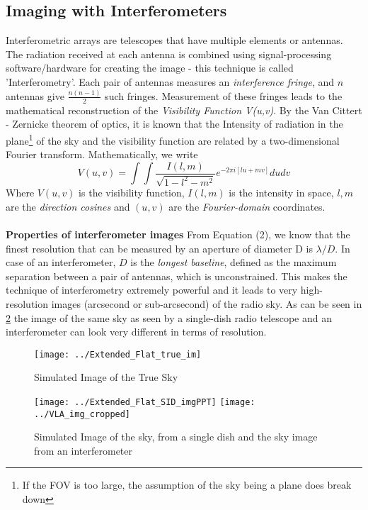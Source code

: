 \documentclass[twocolumn]{aastex61}
\begin{document}
\subsection{Imaging with Interferometers}
Interferometric arrays are telescopes that have multiple elements or antennas. The radiation received at each antenna is combined using signal-processing software/hardware for creating the image - this technique is called 'Interferometry'. Each pair of antennas measures an \textit{interference fringe}, and $n$ antennas give $\frac{n(n-1)}{2}$ such fringes. Measurement of these fringes leads to the mathematical reconstruction of the \textit{Visibility Function V(u,v)}. By the Van Cittert - Zernicke theorem of optics, it is known that the Intensity of radiation in the plane\footnote{If the FOV is too large, the assumption of the sky being a plane does break down} of the sky and the visibility function are related by a two-dimensional Fourier transform.
Mathematically, we write 
\begin{equation}
V(u,v) = \int\int\frac{I(l,m)}{\sqrt{1-l^2 - m^2}} e^{-2\pi i [lu+mv]} du dv
\end{equation} 
Where $V(u,v)$ is the visibility function, $I(l,m)$ is the intensity in space, $l, m$ are the \textit{direction cosines} and $(u,v)$ are the \textit{Fourier-domain} coordinates.\\\\
\textbf{Properties of interferometer images}
From Equation (2), we know that the finest resolution that can be measured by an aperture of diameter D is $\lambda/D$. In case of an interferometer, $D$ is the \textit{longest baseline}, defined as the maximum separation between a pair of antennas, which is unconstrained. 
This makes the technique of interferometry extremely powerful and it leads to very high-resolution images (arcsecond or sub-arcsecond) of the radio sky.
As can be seen in \hyperref[  2]{\figurename{ 2}}
the image of the same sky as seen by a single-dish radio telescope and an interferometer can look very different in terms of resolution.
\begin{figure}
\centering
\texttt{[image: ../Extended\_Flat\_true\_im]}
\caption{Simulated Image of the True Sky}
\label{ 1}
\end{figure}%
\begin{figure}
\centering
\texttt{[image: ../Extended\_Flat\_SID\_imgPPT]}
\texttt{[image: ../VLA\_img\_cropped]}
\caption{Simulated Image of the sky, from a single dish 
		and the sky image from an interferometer}
\label{ 2}
\end{figure}
\end{document}
